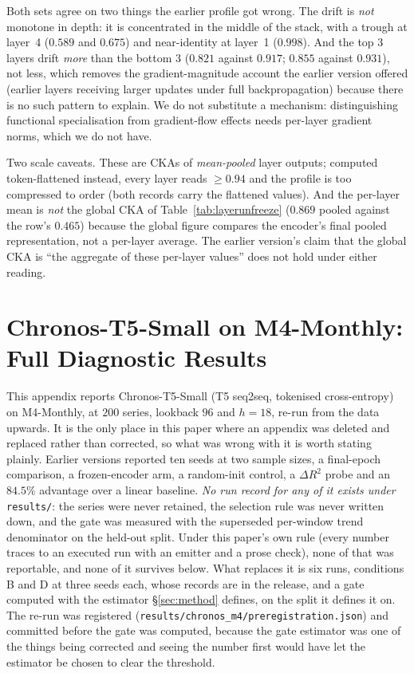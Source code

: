 Both sets agree on two things the earlier profile got wrong.  The drift is
\emph{not} monotone in depth: it is concentrated in the middle of the stack, with
a trough at layer~4 ($0.589$ and $0.675$) and near-identity at layer~1
($0.998$).  And the top 3 layers drift \emph{more} than the bottom 3
($0.821$ against $0.917$; $0.855$ against $0.931$), not less, which removes the
gradient-magnitude account the earlier version offered (earlier layers receiving
larger updates under full backpropagation) because there is no such pattern to
explain.  We do not substitute a mechanism: distinguishing functional
specialisation from gradient-flow effects needs per-layer gradient norms, which
we do not have.

Two scale caveats.  These are CKAs of \emph{mean-pooled} layer outputs; computed
token-flattened instead, every layer reads ${\geq}0.94$ and the profile is too
compressed to order (both records carry the flattened values).  And the
per-layer mean is \emph{not} the global CKA of
Table~\ref{tab:layerunfreeze} ($0.869$ pooled against the row's $0.465$) because
the global figure compares the encoder's final pooled representation, not a
per-layer average.  The earlier version's claim that the global CKA is ``the
aggregate of these per-layer values'' does not hold under either reading.

\section{Chronos-T5-Small on M4-Monthly: Full Diagnostic Results}
\label{app:chronos_detail}

This appendix reports Chronos-T5-Small (T5 seq2seq, tokenised cross-entropy) on
M4-Monthly, at $200$ series, lookback $96$ and $h{=}18$, re-run from the data
upwards.  It is the only place in this paper where an appendix was deleted and
replaced rather than corrected, so what was wrong with it is worth stating
plainly.  Earlier versions reported ten seeds at two sample sizes, a final-epoch
comparison, a frozen-encoder arm, a random-init control, a $\Delta R^2$ probe and
an $84.5\%$ advantage over a linear baseline.  \emph{No run record for any of it
exists under} \texttt{results/}: the series were never retained, the selection
rule was never written down, and the gate was measured with the superseded
per-window trend denominator on the held-out split.  Under this paper's own rule
(every number traces to an executed run with an emitter and a prose check),
none of that was reportable, and none of it survives below.  What replaces it is
six runs, conditions B and D at three seeds each, whose records are in the
release, and a gate computed with the estimator \S\ref{sec:method} defines,
on the split it defines it on.  The re-run was registered
(\texttt{results/chronos\_m4/preregistration.json}) and committed before the gate
was computed, because the gate estimator was one of the things being corrected
and seeing the number first would have let the estimator be chosen to clear the
threshold.

